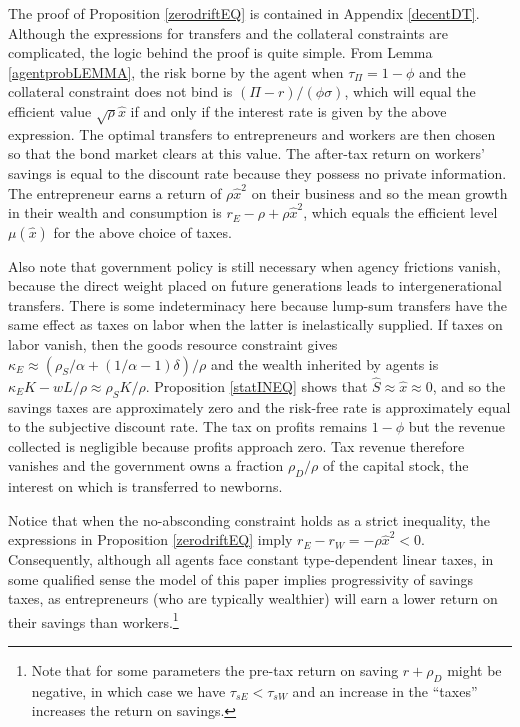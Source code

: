 \documentclass[11pt]{article}
\theoremstyle{plain}
\theoremstyle{definition} %
\begin{document}
The proof of Proposition \ref{zerodriftEQ} is contained in Appendix \ref{decentDT}. Although the expressions for transfers and the collateral constraints are complicated, the logic behind the proof is quite simple. From Lemma \ref{agentprobLEMMA}, the risk borne by the agent when $\tau_{\Pi} = 1 - \phi$ and the collateral constraint does not bind is $(\Pi - r)/(\phi\sigma)$, which will equal the efficient value $\sqrt{\rho}\hat{x}$ if and only if the interest rate is given by the above expression. The optimal transfers to entrepreneurs and workers are then chosen so that the bond market clears at this value. The after-tax return on workers' savings is equal to the discount rate because they possess no private information. The entrepreneur earns a return of $\rho \hat{x}^2$ on their business and so the mean growth in their wealth and consumption is $r_E - \rho + \rho\hat{x}^2$, which equals the efficient level $\mu(\hat{x})$ for the above choice of taxes. 

Also note that government policy is still necessary when agency frictions vanish, because the direct weight placed on future generations leads to intergenerational transfers. There is some indeterminacy here because lump-sum transfers have the same effect as taxes on labor when the latter is inelastically supplied. If taxes on labor vanish, then the goods resource constraint gives $\kappa_E \approx (\rho_S/\alpha + (1/\alpha-1)\delta)/\rho$ and the wealth inherited by agents is $\kappa_EK - wL/\rho \approx \rho_SK/\rho$. Proposition \ref{statINEQ} shows that $\hat{S} \approx \hat{x} \approx 0$, and so the savings taxes are approximately zero and the risk-free rate is approximately equal to the subjective discount rate. The tax on profits remains $1 - \phi$ but the revenue collected is negligible because profits approach zero. Tax revenue therefore vanishes and the government owns a fraction $\rho_D/\rho$ of the capital stock, the interest on which is transferred to newborns. 

Notice that when the no-absconding constraint holds as a strict inequality, the expressions in Proposition \ref{zerodriftEQ} imply $r_E - r_W = - \rho \hat{x}^2 < 0$. Consequently, although all agents face constant type-dependent linear taxes, in some qualified sense the model of this paper implies progressivity of savings taxes, as entrepreneurs (who are typically wealthier) will earn a lower return on their savings than workers.\footnote{Note that for some parameters the pre-tax return on saving $r + \rho_D$ might be negative, in which case we have $\tau_{sE} < \tau_{sW}$ and an increase in the ``taxes'' increases the return on savings.} 
\end{document}
